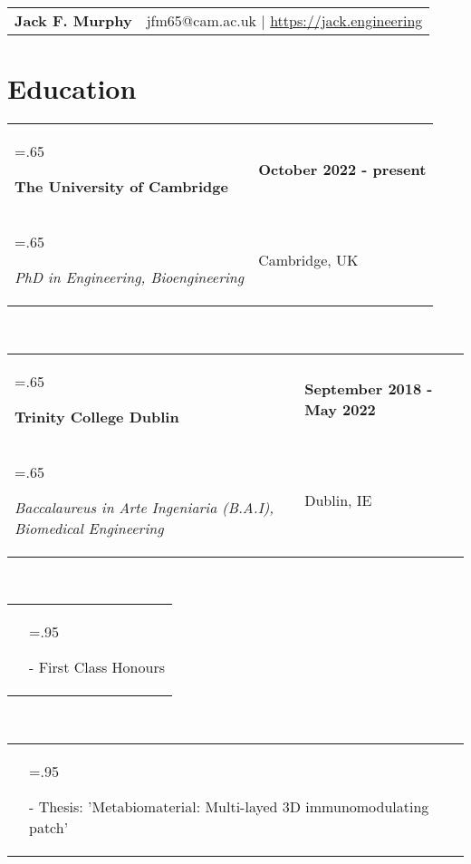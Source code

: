 \documentclass[letterpaper,11pt]{article}
\newcommand{\itemHeadings}[4]{
    \begin{tabularx}{\textwidth} {>{\hsize=.65\textwidth\raggedright\arraybackslash}X 
   >{\raggedleft\arraybackslash}X}
      #1 & \small#2 \\
      #3 & \small#4
    \end{tabularx}
    \\
}
\newcommand{\itemitems}[1]{
    \begin{tabularx}{\textwidth} {>{\raggedleft\arraybackslash}X >{\hsize=.95\textwidth\raggedright\arraybackslash}X}
      &- \small#1 \\
    \end{tabularx}
    \\
}
\newcommand{\heading}[3]{
    \hspace{-15mm}
    \begin{tabular}{p{.4\textwidth} >{\raggedleft}p{.57\textwidth}}
        \textbf{\Huge{#1}}\vspace{5mm} & #2 $|$ #3 \\
    \end{tabular}
}
\newcommand{\sect}[1]{
    \vspace{-.4em}
    \section*{#1}
    \vspace{-3.5mm}
}
\begin{document}
\heading
    {Jack F. Murphy}
    {jfm65@cam.ac.uk}
    {\href{https://jack.engineering}{https://jack.engineering}}

\noindent
\vspace{0cm}

\sect{Education}
    \itemHeadings
        {\textbf{The University of Cambridge}}
        {\textbf{October 2022 - present}}
        {\hspace{5pt}\emph{PhD in Engineering, Bioengineering}}
        {Cambridge, UK}
    \itemHeadings
        {\textbf{Trinity College Dublin}}
        {\textbf{September 2018 - May 2022}}
        {\hspace{5pt}\emph{Baccalaureus in Arte Ingeniaria (B.A.I), Biomedical Engineering}}
        {Dublin, IE}
        \itemitems
            {First Class Honours}
        \itemitems
            {Thesis: 'Metabiomaterial: Multi-layed 3D immunomodulating patch'}

\end{document}
